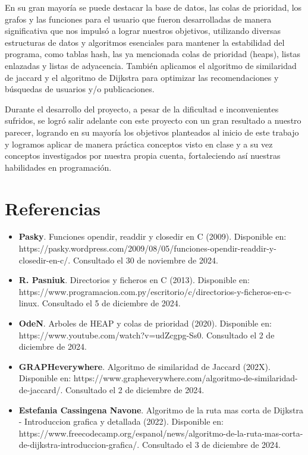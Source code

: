 \documentclass[9pt,letterpaper,onecolumn]{rho-class/rho}
\begin{document}
\vspace{0.5cm}

En su gran mayoría se puede destacar la base de datos, las colas de prioridad, los grafos y las funciones para el usuario que fueron desarrolladas de manera significativa que nos impulsó a lograr nuestros objetivos, utilizando diversas estructuras de datos y algoritmos esenciales para mantener la estabilidad del programa, como tablas hash, las ya mencionada colas de prioridad (heaps), listas enlazadas y listas de adyacencia. También aplicamos el algoritmo de similaridad de jaccard y el algoritmo de Dijkstra para optimizar las recomendaciones y búsquedas de usuarios y/o publicaciones.

\vspace{0.5cm}

Durante el desarrollo del proyecto, a pesar de la dificultad e inconvenientes sufridos, se logró salir adelante con este proyecto con un gran resultado a nuestro parecer, logrando en su mayoría los objetivos planteados al inicio de este trabajo y logramos aplicar de manera práctica conceptos visto en clase y a su vez conceptos investigados por nuestra propia cuenta, fortaleciendo así nuestras habilidades en programación.
\newpage 


\section{Referencias}
\begin{itemize}
    \item \textbf{Pasky}. Funciones opendir, readdir y closedir en C (2009). Disponible en: https://pasky.wordpress.com/2009/08/05/funciones-opendir-readdir-y-closedir-en-c/. Consultado el 30 de noviembre de 2024.

    \item \textbf{R. Pasniuk}. Directorios y ficheros en C (2013). Disponible en: https://www.programacion.com.py/escritorio/c/directorios-y-ficheros-en-c-linux. Consultado el 5 de diciembre de 2024.

    \item \textbf{OdeN}. Arboles de HEAP y colas de prioridad (2020). Disponible en: https://www.youtube.com/watch?v=udZcgpg-Ss0. Consultado el 2 de diciembre de 2024.

    \item \textbf{GRAPHeverywhere}. Algoritmo de similaridad de Jaccard (202X). Disponible en: https://www.grapheverywhere.com/algoritmo-de-similaridad-de-jaccard/. Consultado el 2 de diciembre de 2024.

    \item \textbf{Estefania Cassingena Navone}. Algoritmo de la ruta mas corta de Dijkstra - Introduccion grafica y detallada (2022). Disponible en: https://www.freecodecamp.org/espanol/news/algoritmo-de-la-ruta-mas-corta-de-dijkstra-introduccion-grafica/. Consultado el 3 de diciembre de 2024.
\end{itemize}
\end{document}
